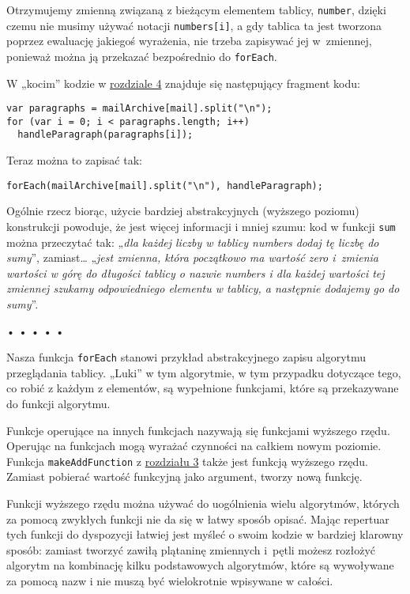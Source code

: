   
Otrzymujemy zmienną związaną z bieżącym elementem tablicy, \texttt{number}, dzięki czemu nie musimy używać notacji \texttt{numbers[i]}, a gdy tablica ta jest tworzona poprzez ewaluację jakiegoś wyrażenia, nie trzeba zapisywać jej w~zmiennej, ponieważ można ją przekazać bezpośrednio do \texttt{forEach}.

  
W „kocim” kodzie w \hyperref[chap:4]{rozdziale 4} znajduje się następujący fragment kodu:

  
\begin{verbatim} 
var paragraphs = mailArchive[mail].split("\n");
for (var i = 0; i < paragraphs.length; i++)
  handleParagraph(paragraphs[i]);
 \end{verbatim}
  
Teraz można to zapisać tak:

  
\begin{verbatim} 
forEach(mailArchive[mail].split("\n"), handleParagraph);
 \end{verbatim}
  
Ogólnie rzecz biorąc, użycie bardziej abstrakcyjnych (wyższego poziomu) konstrukcji powoduje, że jest więcej informacji i mniej szumu: kod w funkcji \texttt{sum} można przeczytać tak: „\emph{dla każdej liczby w tablicy numbers dodaj tę liczbę do sumy}”, zamiast… „\emph{jest zmienna, która początkowo ma wartość zero i~zmienia wartości w górę do długości tablicy o nazwie numbers i dla każdej wartości tej zmiennej szukamy odpowiedniego elementu w tablicy, a następnie dodajemy go do sumy}”.



\begin{center}
• • • • •
\end{center}

  
Nasza funkcja \texttt{forEach} stanowi przykład abstrakcyjnego zapisu algorytmu przeglądania tablicy. „Luki” w tym algorytmie, w tym przypadku dotyczące tego, co robić z każdym z elementów, są wypełnione funkcjami, które są przekazywane do funkcji algorytmu.

  
Funkcje operujące na innych funkcjach nazywają się funkcjami wyższego rzędu. Operując na funkcjach mogą wyrażać czynności na całkiem nowym poziomie. Funkcja \texttt{makeAddFunction} z \hyperref[chap:3]{rozdziału 3} także jest funkcją wyższego rzędu. Zamiast pobierać wartość funkcyjną jako argument, tworzy nową funkcję.

  
Funkcji wyższego rzędu można używać do uogólnienia wielu algorytmów, których za pomocą zwykłych funkcji nie da się w łatwy sposób opisać. Mając repertuar tych funkcji do dyspozycji łatwiej jest myśleć o swoim kodzie w bardziej klarowny sposób: zamiast tworzyć zawiłą plątaninę zmiennych i~pętli możesz rozłożyć algorytm na kombinację kilku podstawowych algorytmów, które są wywoływane za pomocą nazw i nie muszą być wielokrotnie wpisywane w całości.

